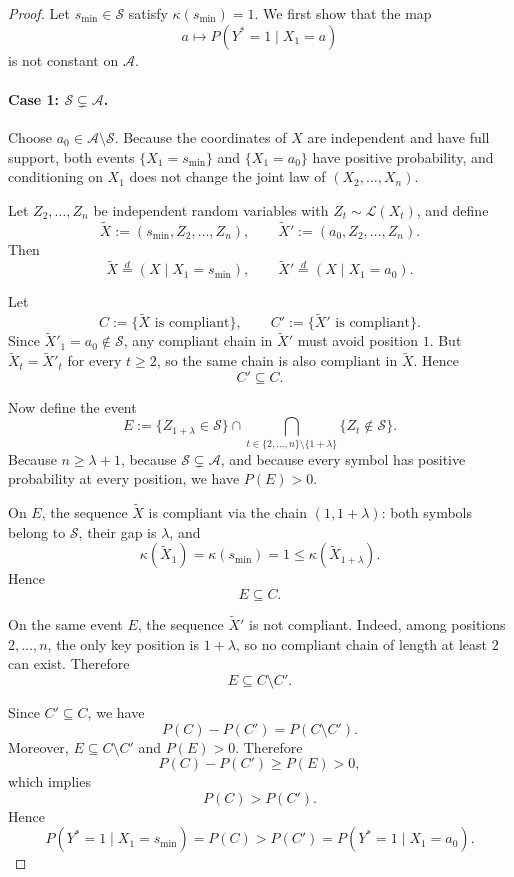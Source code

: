 \documentclass{article}
\theoremstyle{plain}
\theoremstyle{definition}
\theoremstyle{remark}
\begin{document}
\begin{proof}
Let $s_{\min}\in\mathcal{S}$ satisfy $\kappa(s_{\min})=1$.
We first show that the map
\[
a \longmapsto P(Y^*=1\mid X_1=a)
\]
is not constant on $\mathcal{A}$.

\paragraph{Case 1: $\mathcal{S}\subsetneq\mathcal{A}$.}
Choose $a_0\in\mathcal{A}\setminus\mathcal{S}$.
Because the coordinates of $X$ are independent and have full support,
both events $\{X_1=s_{\min}\}$ and $\{X_1=a_0\}$ have positive probability,
and conditioning on $X_1$ does not change the joint law of
$(X_2,\ldots,X_n)$.

Let $Z_2,\ldots,Z_n$ be independent random variables with
$Z_t\sim\mathcal{L}(X_t)$, and define
\[
\widetilde X := (s_{\min},Z_2,\ldots,Z_n),
\qquad
\widetilde X' := (a_0,Z_2,\ldots,Z_n).
\]
Then
\[
\widetilde X \stackrel{d}{=} (X\mid X_1=s_{\min}),
\qquad
\widetilde X' \stackrel{d}{=} (X\mid X_1=a_0).
\]

Let
\[
C := \{\widetilde X \text{ is compliant}\},
\qquad
C' := \{\widetilde X' \text{ is compliant}\}.
\]
Since $\widetilde X'_1=a_0\notin\mathcal{S}$, any compliant chain in
$\widetilde X'$ must avoid position $1$. But
$\widetilde X_t=\widetilde X'_t$ for every $t\ge 2$, so the same chain is
also compliant in $\widetilde X$. Hence
\[
C' \subseteq C.
\]

Now define the event
\[
E
:=
\{Z_{1+\lambda}\in\mathcal{S}\}
\cap
\bigcap_{t\in\{2,\ldots,n\}\setminus\{1+\lambda\}}
\{Z_t\notin\mathcal{S}\}.
\]
Because $n\ge \lambda+1$, because $\mathcal{S}\subsetneq\mathcal{A}$,
and because every symbol has positive probability at every position,
we have $P(E)>0$.

On $E$, the sequence $\widetilde X$ is compliant via the chain
$(1,1+\lambda)$:
both symbols belong to $\mathcal{S}$, their gap is $\lambda$, and
\[
\kappa(\widetilde X_1)=\kappa(s_{\min})=1
\le
\kappa(\widetilde X_{1+\lambda}).
\]
Hence
\[
E \subseteq C.
\]

On the same event $E$, the sequence $\widetilde X'$ is not compliant.
Indeed, among positions $2,\ldots,n$, the only key position is $1+\lambda$,
so no compliant chain of length at least $2$ can exist. Therefore
\[
E \subseteq C\setminus C'.
\]

Since \(C' \subseteq C\), we have
\[
P(C)-P(C') = P(C\setminus C').
\]
Moreover, \(E \subseteq C\setminus C'\) and \(P(E)>0\). Therefore
\[
P(C)-P(C') \ge P(E) > 0,
\]
which implies
\[
P(C) > P(C').
\]
Hence
\[
P(Y^*=1 \mid X_1=s_{\min})
=
P(C)
>
P(C')
=
P(Y^*=1 \mid X_1=a_0).
\]


\end{proof}
\end{document}
